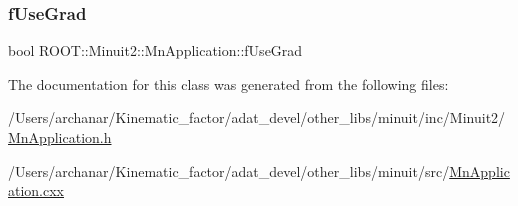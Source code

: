 \subsubsection{\texorpdfstring{fUseGrad}{fUseGrad}}
{\footnotesize\ttfamily bool R\+O\+O\+T\+::\+Minuit2\+::\+Mn\+Application\+::f\+Use\+Grad\hspace{0.3cm}{\ttfamily [protected]}}



The documentation for this class was generated from the following files\+:\begin{DoxyCompactItemize}
\item 
/\+Users/archanar/\+Kinematic\+\_\+factor/adat\+\_\+devel/other\+\_\+libs/minuit/inc/\+Minuit2/\mbox{\hyperlink{other__libs_2minuit_2inc_2Minuit2_2MnApplication_8h}{Mn\+Application.\+h}}\item 
/\+Users/archanar/\+Kinematic\+\_\+factor/adat\+\_\+devel/other\+\_\+libs/minuit/src/\mbox{\hyperlink{MnApplication_8cxx}{Mn\+Application.\+cxx}}\end{DoxyCompactItemize}
